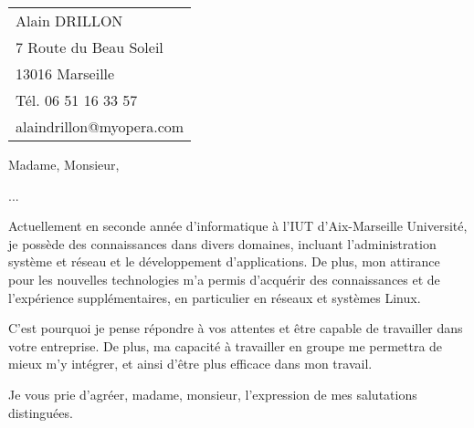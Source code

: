 \documentclass[11pt]{article}
\begin{document}
    \begin{tabular}{l}
        Alain DRILLON \\
        7 Route du Beau Soleil\\
        13016 Marseille\\
        Tél. 06 51 16 33 57\\
        alaindrillon@myopera.com
    \end{tabular}

    \vspace{2cm}

    Madame, Monsieur,
    \vspace{0.75cm}

    ...

    \vspace{0.75cm}
    Actuellement en seconde année d'informatique à l'IUT d'Aix-Marseille Université, je possède des connaissances dans divers domaines, incluant l'administration système et réseau et le développement d'applications.
    De plus, mon attirance pour les nouvelles technologies m'a permis d’acquérir des connaissances et de l'expérience supplémentaires, en particulier en réseaux et systèmes Linux.
   
   C'est pourquoi je pense répondre à vos attentes et être capable de travailler dans votre entreprise. De plus, ma capacité à travailler en groupe me permettra de mieux m'y intégrer, et ainsi d'être plus efficace dans mon travail.

   Je vous prie d'agréer, madame, monsieur, l'expression de mes salutations distinguées.
\end{document}
